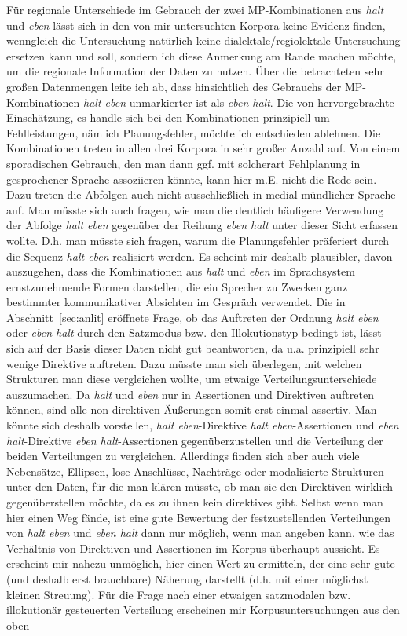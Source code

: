 Für regionale Unterschiede im Gebrauch der zwei MP-Kom\-bi\-na\-ti\-on\-en aus \textit{halt} und \textit{eben} lässt sich in den von mir untersuchten Korpora keine Evidenz finden, wenngleich die Untersuchung natürlich keine dialektale/regiolektale Untersuchung ersetzen kann und soll, sondern ich diese Anmerkung am Rande machen möchte, um die regionale Information der Daten zu nutzen. Über die be\-trachteten sehr großen Datenmengen leite ich ab, dass hinsichtlich des Gebrauchs der MP-Kombi\-nationen \textit{halt eben} unmarkierter ist als \textit{eben halt}. Die von \citet{Autenrieth2002} hervorgebrachte Einschätzung, es handle sich bei den Kombinationen prinzipiell um Fehlleistungen, nämlich Planungsfehler, möchte ich entschieden ablehnen. Die Kombinationen treten in allen drei Korpora in sehr großer Anzahl auf. Von einem sporadischen Gebrauch, den man dann ggf. mit solcherart Fehlplanung in gesprochener Sprache assoziieren könnte, kann hier m.E. nicht die Rede sein. Dazu treten die Abfolgen auch nicht ausschließlich in medial mündlicher Sprache auf. Man müsste sich auch fragen, wie man die deutlich häufigere Verwendung der Abfolge \textit{halt eben} gegenüber der Reihung \textit{eben halt} unter dieser Sicht erfassen wollte. D.h. man müsste sich fragen, warum die Planungsfehler präferiert durch die Sequenz \textit{halt eben} realisiert werden. Es scheint mir deshalb plausibler, davon auszugehen, dass die Kombinationen aus \textit{halt} und \textit{eben} im Sprachsystem ernstzunehmende Formen darstellen, die ein Sprecher zu Zwecken ganz bestimmter kommunikativer Absichten im Gespräch verwendet. Die in Abschnitt~\ref{sec:anlit} eröff\-nete Frage, ob das Auftreten der Ordnung \textit{halt eben} oder \textit{eben halt} durch den Satzmodus  bzw. den Illokutionstyp  bedingt ist, lässt sich auf der Basis dieser Daten nicht gut beantworten, da u.a. prinzipiell sehr wenige Direktive auftreten. Dazu müsste man sich überlegen, mit welchen Strukturen man diese vergleichen wollte, um etwaige Verteilungsunterschiede auszumachen. Da \textit{halt} und \textit{eben} nur in Assertionen und Direktiven auftreten können, sind alle non-direktiven Äußerungen somit erst einmal assertiv. Man könnte sich deshalb vorstellen, \textit{halt eben}-Direktive \textit{halt eben}-Assertionen und \textit{eben halt}-Direktive \textit{eben halt}-Assertio\-nen gegenüberzustellen und die Verteilung der beiden Verteilungen zu vergleichen. Allerdings finden sich aber auch viele Nebensätze, Ellipsen, lose Anschlüsse, Nachträge oder modalisierte Strukturen unter den Daten, für die man klären müsste, ob man sie den Direktiven wirklich gegenüberstellen möchte, da es zu ihnen kein direktives  gibt. Selbst wenn man hier einen Weg fände, ist eine gute Bewertung der festzustellenden Verteilungen von \textit{halt eben} und \textit{eben halt} dann nur möglich, wenn man angeben kann, wie das Verhältnis von Direktiven und Assertionen im Korpus überhaupt aussieht. Es erscheint mir nahezu unmöglich, hier einen Wert zu ermitteln, der eine sehr gute (und deshalb erst brauchbare) Näherung darstellt (d.h. mit einer möglichst kleinen Streuung). Für die Frage nach einer etwaigen satzmodalen bzw. illokutionär ge\-steuerten Verteilung erscheinen mir Korpusuntersuchungen aus den oben 